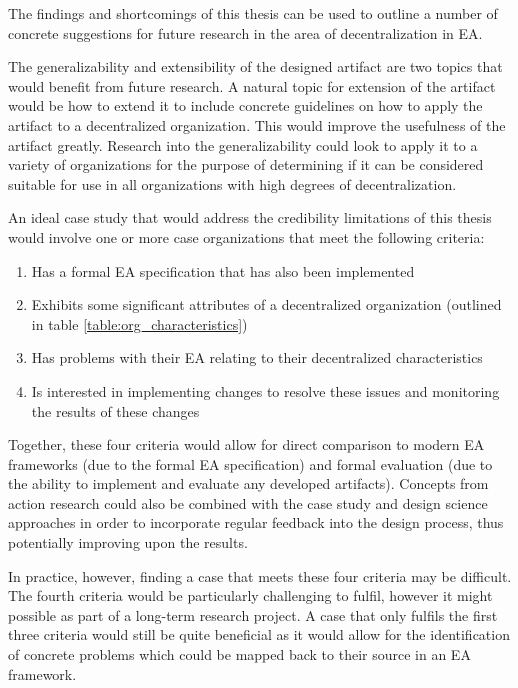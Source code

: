 The findings and shortcomings of this thesis can be used to outline a number of concrete suggestions for future research in the area of decentralization in EA. 

The generalizability and extensibility of the designed artifact are two topics that would benefit from future research. A natural topic for extension of the artifact would be how to extend it to include concrete guidelines on how to apply the artifact to a decentralized organization. This would improve the usefulness of the artifact greatly. Research into the generalizability could look to apply it to a variety of organizations for the purpose of determining if it can be considered suitable for use in all organizations with high degrees of decentralization.

An ideal case study that would address the credibility limitations of this thesis would involve one or more case organizations that meet the following criteria:

\begin{enumerate}
\item Has a formal EA specification that has also been implemented
\item Exhibits some significant attributes of a decentralized organization (outlined in table \ref{table:org_characteristics})
\item Has problems with their EA relating to their decentralized characteristics
\item Is interested in implementing changes to resolve these issues and monitoring the results of these changes
\end{enumerate}

Together, these four criteria would allow for direct comparison to modern EA frameworks (due to the formal EA specification) and formal evaluation (due to the ability to implement and evaluate any developed artifacts). Concepts from action research could also be combined with the case study and design science approaches in order to incorporate regular feedback into the design process, thus potentially improving upon the results. 

In practice, however, finding a case that meets these four criteria may be difficult. The fourth criteria would be particularly challenging to fulfil, however it might possible as part of a long-term research project. A case that only fulfils the first three criteria would still be quite beneficial as it would allow for the identification of concrete problems which could be mapped back to their source in an EA framework. 

